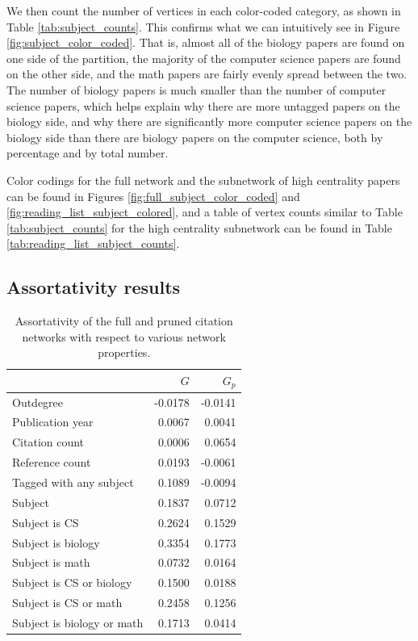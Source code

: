 \documentclass[12pt]{thesis}
\theoremstyle{plain}
\theoremstyle{definition}
\theoremstyle{remark}
\begin{document}
We then count the number of vertices in each color-coded category, as shown in Table \ref{tab:subject_counts}. This confirms what we can intuitively see in Figure \ref{fig:subject_color_coded}. That is, almost all of the biology papers are found on one side of the partition, the majority of the computer science papers are found on the other side, and the math papers are fairly evenly spread between the two. The number of biology papers is much smaller than the number of computer science papers, which helps explain why there are more untagged papers on the biology side, and why there are significantly more computer science papers on the biology side than there are biology papers on the computer science, both by percentage and by total number.

Color codings for the full network and the subnetwork of high centrality papers can be found in Figures \ref{fig:full_subject_color_coded} and \ref{fig:reading_list_subject_colored}, and a table of vertex counts similar to Table \ref{tab:subject_counts} for the high centrality subnetwork can be found in Table \ref{tab:reading_list_subject_counts}.

\subsection{Assortativity results}

\begin{table}[h]
\centering
\begin{tabular}{|l|r|r|}
\hline
 & $G$ & $G_p$ \\ \hline\hline
Outdegree & -0.0178 & -0.0141 \\ \hline
Publication year & 0.0067 & 0.0041 \\ \hline
Citation count & 0.0006 & 0.0654 \\ \hline
Reference count & 0.0193 & -0.0061 \\ \hline
Tagged with any subject & 0.1089 & -0.0094 \\ \hline
Subject & 0.1837 & 0.0712 \\ \hline
Subject is CS & 0.2624 & 0.1529 \\ \hline
Subject is biology & 0.3354 & 0.1773 \\ \hline
Subject is math & 0.0732 & 0.0164 \\ \hline
Subject is CS or biology & 0.1500 & 0.0188 \\ \hline
Subject is CS or math & 0.2458 & 0.1256 \\ \hline
Subject is biology or math & 0.1713 & 0.0414 \\ \hline
\end{tabular}
\caption{Assortativity of the full and pruned citation networks with respect to various network properties.}
\label{tab:assortativity}
\end{table}
\end{document}
